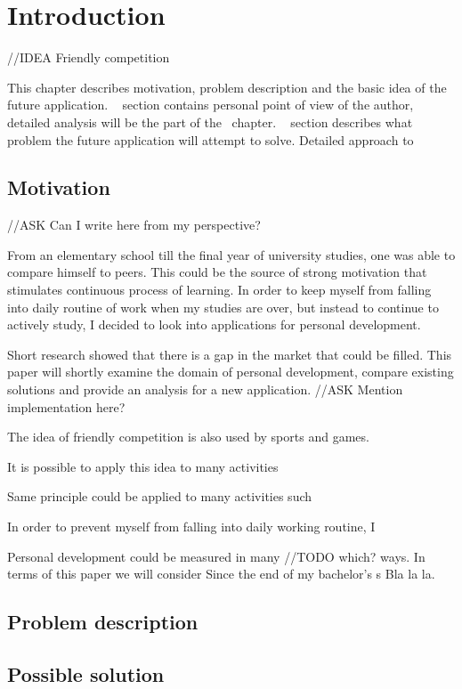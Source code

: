 
\chapter{Introduction}\label{ch:introduction}

{\color{red}//IDEA Friendly competition}

This chapter describes motivation, problem description and the basic idea
of the future application.
~ section contains personal point of view of the author,
detailed analysis will be the part of the~ chapter.
~ section describes what problem the future application will attempt to solve.
Detailed approach to 


\section{Motivation}\label{sec:motivation}

{\color{gray}//ASK Can I write here from my perspective?}

From an elementary school till the final year of university studies, one was able to compare himself to peers.
This could be the source of strong motivation that stimulates continuous process of learning.
In order to keep myself from falling into daily routine of work when my studies are over,
but instead to continue to actively study, I decided to look into applications for personal development.

Short research showed that there is a gap in the market that could be filled.
This paper will shortly examine the domain of personal development, compare existing solutions and provide an analysis for a
new application.
{\color{gray}//ASK Mention implementation here?}


The idea of friendly competition is also used by sports and games.

It is possible to apply this idea to many activities

Same principle could be applied to many activities such

In order to prevent myself from falling into daily working routine, I



Personal development could be measured in many {\color{blue}//TODO which?} ways.
In terms of this paper we will consider
Since the end of my bachelor's s
Bla la la.

\section{Problem description}\label{sec:problem-description}

\section{Possible solution}\label{sec:possible-solution}
